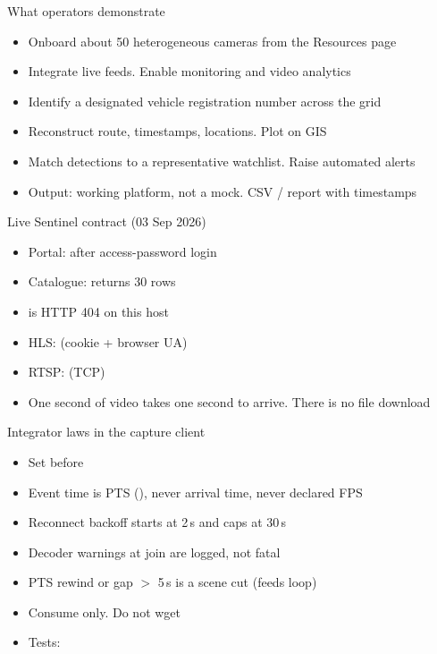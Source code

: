 \documentclass[aspectratio=169,11pt]{beamer}
\begin{document}
\begin{frame}{What operators demonstrate}
\begin{itemize}\itemsep0.55em
\item Onboard about 50 heterogeneous cameras from the Resources page
\item Integrate live feeds. Enable monitoring and video analytics
\item Identify a designated vehicle registration number across the grid
\item Reconstruct route, timestamps, locations. Plot on GIS
\item Match detections to a representative watchlist. Raise automated alerts
\item Output: working platform, not a mock. CSV / report with timestamps
\end{itemize}
\end{frame}

\begin{frame}{Live Sentinel contract (03 Sep 2026)}
\begin{itemize}\itemsep0.5em
\item Portal:  after access-password login
\item Catalogue:  returns 30 rows 
\item {} is HTTP 404 on this host
\item HLS:  (cookie + browser UA)
\item RTSP:  (TCP)
\item One second of video takes one second to arrive. There is no file download
\end{itemize}
\end{frame}

\begin{frame}{Integrator laws in the capture client}
\begin{itemize}\itemsep0.45em
\item Set  before 
\item Event time is PTS (), never arrival time, never declared FPS
\item Reconnect backoff starts at 2\,s and caps at 30\,s
\item Decoder warnings at join are logged, not fatal
\item PTS rewind or gap $>$ 5\,s is a scene cut (feeds loop)
\item Consume only. Do not wget 
\item Tests: 
\end{itemize}
\end{frame}
\end{document}
